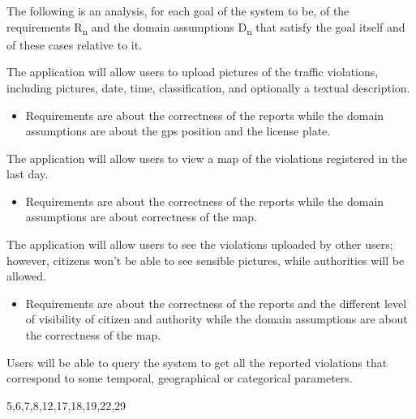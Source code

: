 \documentclass[../RASD.tex]{subfiles}
\begin{document}
                The following is an analysis, for each goal of the system to be, of the requirements R\textsubscript{n} and the domain assumptions D\textsubscript{n} that satisfy the goal itself and of these cases relative to it.
                \begin{enumerate}
                     The application will allow users to upload pictures of the traffic violations, including pictures, date, time, classification, and optionally a textual description.
                        \begin{itemize}
                            \requirement{} 1,2,3,4,5,6,9,14,15,16,17,18,19,20,21,26
                            \assumption{} 1,2,4
                            \item Requirements are about the correctness of the reports while the domain assumptions are about the gps position and the license plate.
                        \end{itemize}
                     The application will allow users to view a map of the violations registered in the last day.
                    \begin{itemize}
                        \requirement{} 1,,2,3,4,5,6,7,8,1011,12,17,18,28
                        \assumption{} 1,3
                        \item Requirements are about the correctness of the reports while the domain assumptions are about correctness of the map.
                    \end{itemize}
                     The application will allow users to see the violations uploaded by other users; however, citizens won’t be able to see sensible pictures, while authorities will be allowed.
                    \begin{itemize}
                        \requirement{} 1,2,3,4,5,6,7,8,11,12,17,18,19,20
                        \assumption{} 2,3,4
                        \item Requirements are about the correctness of the reports and the different level of visibility of citizen and authority while the domain assumptions are about the correctness of the map.
                    \end{itemize}
                     Users will be able to query the system to get all the reported violations that correspond to some temporal, geographical or categorical parameters.
                    \begin{itemize}
                        \requirement{} 5,6,7,8,12,17,18,19,22,29

\end{itemize}
\end{enumerate}
\end{document}
